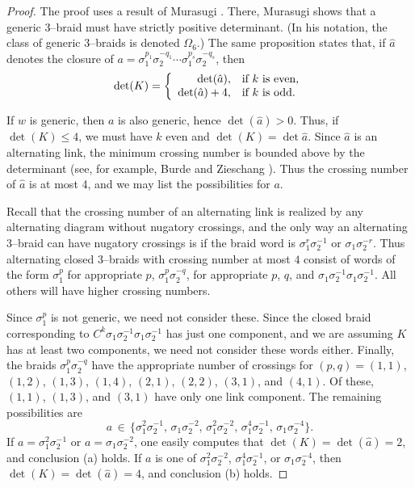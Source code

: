 \documentclass[11pt]{amsart}
\theoremstyle{plain}
\theoremstyle{definition}
\begin{document}
\begin{proof}
The proof uses a result of Murasugi \cite[Proposition 5.1]{murasugi:3braids}. There, Murasugi shows that a generic $3$--braid must have strictly positive determinant. (In his notation, the class of generic $3$--braids is denoted $\Omega_6$.) The same proposition states that, if $\hat{a}$ denotes the closure of $a=\sigma_1^{p_1} \sigma_2^{-q_1} \cdots \sigma_1^{p_s} \sigma_2^{-q_s}$, then
$$\det(K) = \left\{ 
\begin{array}{r l}
\det(\hat{a}), & \mbox{if $k$ is even,} \\
\det(\hat{a})+4, &  \mbox{if $k$ is odd.}
\end{array} \right. $$

If $w$ is generic, then $a$ is also generic, hence $\det(\hat{a})>0$. Thus, if $\det(K) \leq 4$, we must have $k$ even and $\det(K) = \det{\hat{a}}$.
%
Since $\hat{a}$ is an
alternating link, the minimum crossing number is bounded above by the
determinant (see, for example, Burde and Zieschang
\cite{burde-zieschang:knots}).  Thus the crossing number of $\hat{a}$ is at 
most 4, and we may list the
possibilities for $a$.

Recall that the crossing number of an alternating link is
realized by any alternating diagram without nugatory crossings, and
the only way an alternating 3--braid can have nugatory crossings is if
the braid word is $\sigma_1^r \sigma_2^{-1}$ or $\sigma_1
\sigma_2^{-r}$.  Thus alternating closed 3--braids with crossing
number at most $4$ consist of words of the form $\sigma_1^p$ for
appropriate $p$, $\sigma_1^{p} \sigma_2^{-q}$, for appropriate $p$,
$q$, and $\sigma_1\sigma_2^{-1}\sigma_1 \sigma_2^{-1}$.  All others
will have higher crossing numbers.

Since $\sigma_1^p$ is not generic, we need not consider these.
Since the closed braid corresponding to $C^k \sigma_1 \sigma_2^{-1}
\sigma_1 \sigma_2^{-1}$ has just one component, and we are assuming
$K$ has at least two components, we need not consider these words
either.  Finally, the braids $\sigma_1^p \sigma_2^{-q}$ have
 the appropriate number of crossings for $(p,q) =
(1,1)$, $(1,2)$, $(1,3)$, $(1, 4)$, $(2, 1)$, $(2,2)$, $(3, 1)$, and
$(4, 1)$.  Of these, $(1,1)$, $(1,3)$, and $(3,1)$ have only one link
component. The remaining possibilities are
$$a \,  \in \,  \{  \sigma_1^2 \sigma_2^{-1} , \,  \sigma_1
\sigma_2^{-2},  \, \sigma_1^2 \sigma_2^{-2}, \,  \sigma_1^4
\sigma_2^{-1}, \,  \sigma_1 \sigma_2^{-4} \}.$$
If $a = \sigma_1^2 \sigma_2^{-1}$ or $a=  \sigma_1
\sigma_2^{-2}$, one easily computes that $\det(K) = \det(\hat{a})=2$, and conclusion (a) holds. If $a$ is one of $\sigma_1^2 \sigma_2^{-2}$, $ \sigma_1^4
\sigma_2^{-1}$,  or $\sigma_1 \sigma_2^{-4}$, then $\det(K) = \det(\hat{a})=4$, and conclusion (b) holds.
\end{proof}
\end{document}
